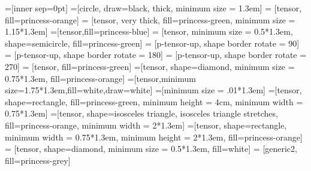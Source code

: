 \usepackage{tikz}
\usepackage{pgfplots}
\usepackage{tikzscale}




\usetikzlibrary{decorations.markings}
\usetikzlibrary{decorations.pathreplacing}
\usetikzlibrary{shapes.geometric}
\usetikzlibrary{positioning}
\usetikzlibrary{plotmarks}
\usetikzlibrary{arrows.meta}
\usepackage{grffile}





\def\tensorsize{1.3em}


=[inner sep=0pt]
=[circle, draw=black, thick, minimum size = \tensorsize]
 = [tensor, fill=princess-orange]
 = [tensor, very thick, fill=princess-green, minimum size =
1.15*\tensorsize]
=[tensor,fill=princess-blue]
 = [tensor, minimum size = 0.5*\tensorsize, shape=semicircle,
fill=princess-green]
 = [p-tensor-up, shape border rotate = 90]
 = [p-tensor-up, shape border rotate = 180]
 = [p-tensor-up, shape border rotate = 270]
 = [tensor, fill=princess-green]
=[tensor, shape=diamond, minimum size = 0.75*\tensorsize, fill=princess-orange]
=[tensor,minimum size=1.75*\tensorsize,fill=white,draw=white]
=[minimum size = .01*\tensorsize]
=[tensor, shape=rectangle, fill=princess-green, minimum
height = 4cm, minimum width = 0.75*\tensorsize]
=[tensor, shape=isosceles triangle, isosceles triangle stretches,
fill=princess-orange, minimum width = 2*\tensorsize]
=[tensor, shape=rectangle, minimum width = 0.75*\tensorsize, minimum
height = 2*\tensorsize, fill=princess-orange]
 = [tensor, shape=diamond, minimum size =
0.5*\tensorsize, fill=white]
 = [generic2, fill=princess-grey]

